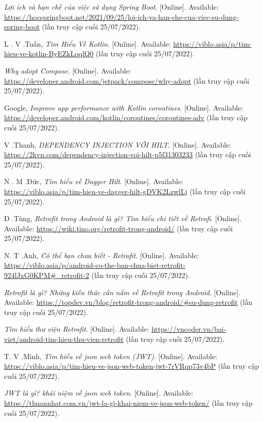\documentclass[../Main.tex]{subfiles}
\begin{document}
\cite{SpringBoot} \textit{Lợi ích và hạn chế của việc sử dụng Spring Boot}. [Online]. Available: \url{https://hocspringboot.net/2021/09/25/loi-ich-va-han-che-cua-viec-su-dung-spring-boot} (lần truy cập cuối
25/07/2022). 

\cite{Kotlin}	L . V .Tuấn, \textit{Tìm Hiểu Về Kotlin}. [Online]. Available: \url{https://viblo.asia/p/tim-hieu-ve-kotlin-ByEZkLoqlQ0} (lần truy cập cuối 25/07/2022).

\cite{Compose} \textit{Why adopt Compose}. [Online]. Available: \url{https://developer.android.com/jetpack/compose/why-adopt} (lần truy cập cuối
25/07/2022). 

\cite{Coroutines} Google, \textit{Improve app performance with Kotlin coroutines}. [Online]. Available: \url{https://developer.android.com/kotlin/coroutines/coroutines-adv} (lần truy cập cuối
25/07/2022). 

\cite{Hilt1} V .Thanh, \textit{DEPENDENCY INJECTION VỚI HILT}. [Online]. Available: \url{https://2kvn.com/dependency-injection-voi-hilt-p5f31303233} (lần truy cập cuối
25/07/2022). 


\cite{Hilt2} N . M .Đức, \textit{Tìm hiểu về Dagger Hilt}. [Online]. Available: \url{https://viblo.asia/p/tim-hieu-ve-dagger-hilt-gDVK2LzwlLj} (lần truy cập cuối
25/07/2022). 

\cite{Retrofit1} Đ .Tùng, \textit{Retrofit trong Android là gì? Tìm hiểu chi tiết về Retrofi}. [Online]. Available: \url{https://wiki.tino.org/retrofit-trong-android/} (lần truy cập cuối
25/07/2022). 

\cite{Retrofit2}  N. T .Anh, \textit{ Có thể bạn chưa biết - Retrofit}. [Online]. Available: \url{https://viblo.asia/p/android-co-the-ban-chua-biet-retrofit-924lJxG0KPM#_retrofit-2} (lần truy cập cuối
25/07/2022). 

\cite{Retrofit3}  \textit{Retrofit là gì? Những kiến thức cần nắm về Retrofit trong Android}. [Online]. Available: \url{https://topdev.vn/blog/retrofit-trong-android/#su-dung-retrofit} (lần truy cập cuối
25/07/2022). 

\cite{Retrofit4} \textit{Tìm hiểu thư viện Retrofit}. [Online]. Available: \url{https://vncoder.vn/bai-viet/android-tim-hieu-thu-vien-retrofit} (lần truy cập cuối
25/07/2022). 

\cite{Jwt1}  T. V .Minh, \textit{Tìm hiểu về json web token (JWT)}. [Online]. Available: \url{https://viblo.asia/p/tim-hieu-ve-json-web-token-jwt-7rVRqp73v4bP} (lần truy cập cuối
25/07/2022). 

\cite{Jwt2}  \textit{JWT là gì? khái niệm về json web token}. [Online]. Available: \url{https://thuannhat.com.vn/jwt-la-gi-khai-niem-ve-json-web-token/} (lần truy cập cuối
25/07/2022). 
\end{document}
